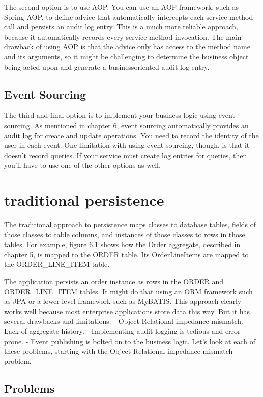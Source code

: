 The second option is to use AOP. You can use an AOP framework, such as Spring
AOP, to define advice that automatically intercepts each service method call and persists an audit log entry. This is a much more reliable approach, because it automatically records every service method invocation. The main drawback of using AOP is
that the advice only has access to the method name and its arguments, so it might be
challenging to determine the business object being acted upon and generate a businessoriented audit log entry.

\subsection{Event Sourcing}

The third and final option is to implement your business logic using event sourcing.
As mentioned in chapter 6, event sourcing automatically provides an audit log for create and update operations. You need to record the identity of the user in each event.
One limitation with using event sourcing, though, is that it doesn’t record queries. If
your service must create log entries for queries, then you’ll have to use one of the
other options as well.

\section{traditional persistence}

The traditional approach to persistence maps classes to database tables, fields of those
classes to table columns, and instances of those classes to rows in those tables. For
example, figure 6.1 shows how the Order aggregate, described in chapter 5, is mapped to the ORDER table. Its OrderLineItems are mapped to the ORDER\_LINE\_ITEM table.

The application persists an order instance as rows in the ORDER and ORDER\_LINE\_ITEM
tables. It might do that using an ORM framework such as JPA or a lower-level framework such as MyBATIS.
 This approach clearly works well because most enterprise applications store data
this way. But it has several drawbacks and limitations:
- Object-Relational impedance mismatch.
- Lack of aggregate history.
- Implementing audit logging is tedious and error prone.
- Event publishing is bolted on to the business logic.
Let’s look at each of these problems, starting with the Object-Relational impedance
mismatch problem. \citep{richardson2018microservices}

\subsection{Problems}

